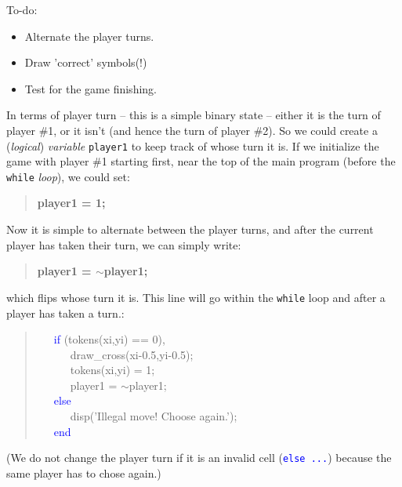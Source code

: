 \documentclass{tufte-book} %
\newenvironment{docspec}{\begin{quotation}\ttfamily\parskip0pt\parindent0pt\ignorespaces}{\end{quotation}}
\newenvironment{docspecbold}{\begin{quotation}\ttfamily\bfseries\parskip0pt\parindent0pt\ignorespaces}{\end{quotation}}
\begin{document}
To-do:
\begin{itemize}[noitemsep]
\setlength{\itemindent}{.2in}
\item Alternate the player turns.
\item Draw 'correct' symbols(!)
\item Test for the game finishing.
\end{itemize}

In terms of player turn -- this is a simple binary state -- either it is the turn of player \#1, or it isn't (and hence the turn of player \#2). So we could create a (\textit{logical}) \textit{variable} \texttt{player1} to keep track of whose turn it is. If we initialize the game with player \#1 starting first, near the top of the main program (before the \texttt{while} \textit{loop}), we could set:
\begin{docspecbold}
player1 = 1;
\end{docspecbold}

Now it is simple to alternate between the player turns, and after the current player has taken their turn, we can simply write:
\begin{docspecbold}
player1 = \(\sim\)player1;
\end{docspecbold}
which flips whose turn it is. This line will go within the \texttt{while} loop and after a player has taken a turn.:
\begin{docspec}
\ \ \     \textcolor{blue}{if} (tokens(xi,yi) == 0),\\
\ \ \ \ \ \         draw\_cross(xi-0.5,yi-0.5);\\
\ \ \ \ \ \        tokens(xi,yi) = 1;\\
\ \ \ \ \ \         player1 = \(\sim\)player1;\\
\ \ \     \textcolor{blue}{else}\\
\ \ \ \ \ \         disp(\textcolor[rgb]{1,0,1}{'Illegal move! Choose again.'});\\
\ \ \     \textcolor{blue}{end}
\end{docspec}
(We do not change the player turn if it is an invalid cell (\texttt{\textcolor{blue}{else ...}}) because the same player has to chose again.)
\end{document}
